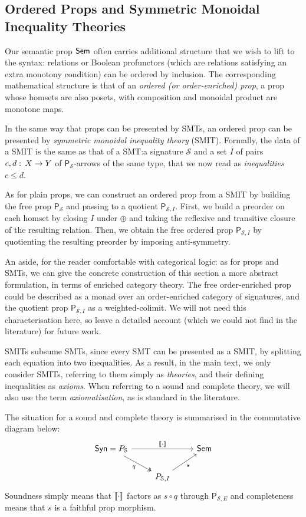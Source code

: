 \documentclass{lmcs}
\theoremstyle{plain}\newtheorem{satz}[thm]{Satz} %
\begin{document}
\subsection{Ordered Props and Symmetric Monoidal Inequality Theories}\label{sec:smit}

Our semantic prop $\mathsf{Sem}$ often carries additional structure that we wish to lift to the syntax: relations or Boolean profunctors (which are relations satisfying an extra monotony condition) can be ordered by inclusion. The corresponding mathematical structure is that of an \emph{ordered (or order-enriched) prop}, a prop whose homsets are also posets, with composition and monoidal product are monotone maps.

In the same way that props can be presented by  SMTs, an ordered prop can be presented by \emph{symmetric monoidal inequality theory} (SMIT). Formally, the data of a SMIT is the same as that of a SMT:\@ a signature $\mathcal{S}$
and a set $I$ of pairs $c,d\mathrel{:}\, X\to Y$ of $\mathsf{P}_\mathcal{S}$-arrows  of the same type, that we now read as \emph{inequalities} $c\leq d$.

As for plain props, we can construct an ordered prop from a SMIT by building the free prop $\mathsf{P}_\mathcal{S}$ and passing to a quotient $\mathsf{P}_{\mathcal{S},I}$. First, we build a preorder on each homset by closing $I$ under $\oplus$ and taking the reflexive and transitive closure of the resulting relation. Then, we obtain the free ordered prop $\mathsf{P}_{\mathcal{S},I}$ by quotienting the resulting preorder by imposing anti-symmetry.

An aside, for the reader comfortable with categorical logic: as for props and SMTs, we can give the concrete construction of this section a more abstract formulation, in terms of enriched category theory. The free order-enriched prop could be described as a monad over an order-enriched category of signatures, and the quotient prop $\mathsf{P}_{\mathcal{S},I}$ as a weighted-colimit. We will not need this characterisation here, so leave a detailed account (which we could not find in the literature) for future work.

SMITs subsume SMTs, since every SMT can be presented as a SMIT, by splitting each equation into two inequalities. As a result, in the main text, we only consider SMITs, referring to them simply as \emph{theories}, and their defining inequalities as \emph{axioms}. When referring to a sound and complete theory, we will also use the term \emph{axiomatisation}, as is standard in the literature.

The situation for a sound and complete theory is summarised in the commutative diagram below:
\[
\begin{tikzcd}
\Syn = P_\mathcal{S} \arrow[rd, "q"', two heads] \arrow[rr, "\sem{\cdot}"] &                                 & \Sem \\
                                                                      & {P_{\mathcal{S},I}} \arrow[ru, "s"'] &
\end{tikzcd}
\]
Soundness simply means that $\left\llbracket{\cdot}\right\rrbracket$ factors as $s\circ q$ through $\mathsf{P}_{\mathcal{S},E}$ and completeness means that $s$ is a faithful prop morphism.
\end{document}
